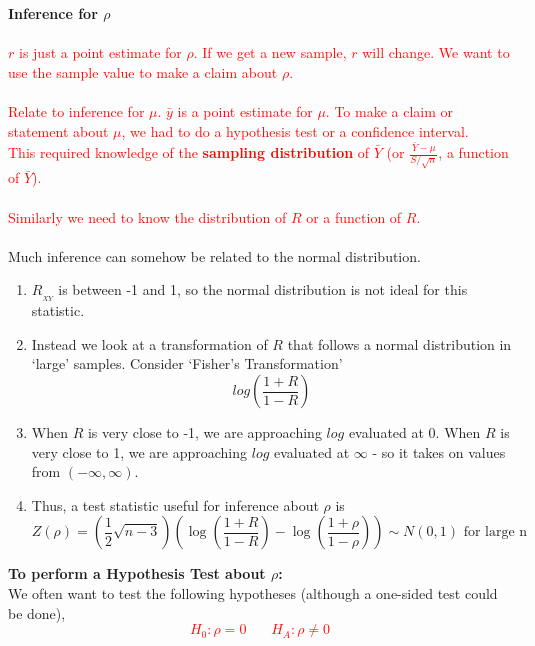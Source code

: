 \Large \textbf{Inference for $\rho$} \large\\

\textcolor{red}{\\$r$ is just a point estimate for $\rho$.  If we get a new sample, $r$ will change.  We want to use the sample value to make a claim about $\rho$.\\~\\
Relate to inference for $\mu$. $\bar{y}$ is a point estimate for $\mu$.  To make a claim or statement about $\mu$, we had to do a hypothesis test or a confidence interval.\\
This required knowledge of the \textbf{sampling distribution} of $\bar{Y}$ (or $\frac{\bar{Y}-\mu}{S/\sqrt{n}}$, a function of $\bar{Y}$).\\~\\
Similarly we need to know the distribution of $R$ or a function of $R$.}\\~\\

Much inference can somehow be related to the normal distribution.  
\begin{enumerate}
\item $R_{_{XY}}$ is between -1 and 1, so the normal distribution is not ideal for this statistic.
\item Instead we look at a transformation of $R$ that follows a normal distribution in `large' samples. Consider `Fisher's Transformation'
$$log\left(\frac{1+R}{1-R}\right)$$
\item When $R$ is very close to -1, we are approaching $log$ evaluated at 0.  When $R$ is very close to 1, we are approaching $log$ evaluated at $\infty$ - so it takes on values from $(-\infty, \infty)$. 
\item Thus, a test statistic useful for inference about $\rho$ is
$$Z(\rho)= \left(\frac{1}{2}\sqrt{n-3}\right)\left(\log \left(\frac{1+R}{1-R}\right) - \log \left(\frac{1+\rho}{1-\rho}\right)\right)\sim N(0,1)\mbox{ for large n}$$ 
\end{enumerate}

\newpage

\Large\textbf{To perform a Hypothesis Test about $\rho$:}\large\\
We often want to test the following hypotheses (although a one-sided test could be done),%
\textcolor{red}{$$H_0:\rho=0 ~~~~~~~~H_A: \rho\neq 0$$~\\~\\~\\~\\}

